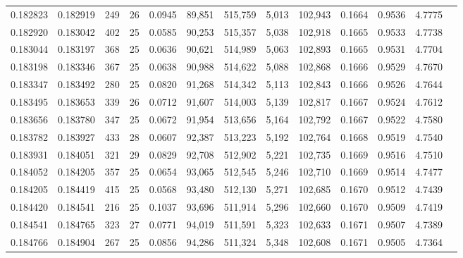\begin{tabular}{rrrrrrrrrrrrr}
0.182823 & 0.182919 &   249 &  26 &                                     0.0945 &  89,851 & 515,759 &   5,013 & 102,943 & 0.1664 & 0.9536 & 4.7775 \\
0.182920 & 0.183042 &   402 &  25 &                                     0.0585 &  90,253 & 515,357 &   5,038 & 102,918 & 0.1665 & 0.9533 & 4.7738 \\
0.183044 & 0.183197 &   368 &  25 &                                     0.0636 &  90,621 & 514,989 &   5,063 & 102,893 & 0.1665 & 0.9531 & 4.7704 \\
0.183198 & 0.183346 &   367 &  25 &                                     0.0638 &  90,988 & 514,622 &   5,088 & 102,868 & 0.1666 & 0.9529 & 4.7670 \\
0.183347 & 0.183492 &   280 &  25 &                                     0.0820 &  91,268 & 514,342 &   5,113 & 102,843 & 0.1666 & 0.9526 & 4.7644 \\
0.183495 & 0.183653 &   339 &  26 &                                     0.0712 &  91,607 & 514,003 &   5,139 & 102,817 & 0.1667 & 0.9524 & 4.7612 \\
0.183656 & 0.183780 &   347 &  25 &                                     0.0672 &  91,954 & 513,656 &   5,164 & 102,792 & 0.1667 & 0.9522 & 4.7580 \\
0.183782 & 0.183927 &   433 &  28 &                                     0.0607 &  92,387 & 513,223 &   5,192 & 102,764 & 0.1668 & 0.9519 & 4.7540 \\
0.183931 & 0.184051 &   321 &  29 &                                     0.0829 &  92,708 & 512,902 &   5,221 & 102,735 & 0.1669 & 0.9516 & 4.7510 \\
0.184052 & 0.184205 &   357 &  25 &                                     0.0654 &  93,065 & 512,545 &   5,246 & 102,710 & 0.1669 & 0.9514 & 4.7477 \\
0.184205 & 0.184419 &   415 &  25 &                                     0.0568 &  93,480 & 512,130 &   5,271 & 102,685 & 0.1670 & 0.9512 & 4.7439 \\
0.184420 & 0.184541 &   216 &  25 &                                     0.1037 &  93,696 & 511,914 &   5,296 & 102,660 & 0.1670 & 0.9509 & 4.7419 \\
0.184541 & 0.184765 &   323 &  27 &                                     0.0771 &  94,019 & 511,591 &   5,323 & 102,633 & 0.1671 & 0.9507 & 4.7389 \\
0.184766 & 0.184904 &   267 &  25 &                                     0.0856 &  94,286 & 511,324 &   5,348 & 102,608 & 0.1671 & 0.9505 & 4.7364 \\

\end{tabular}
